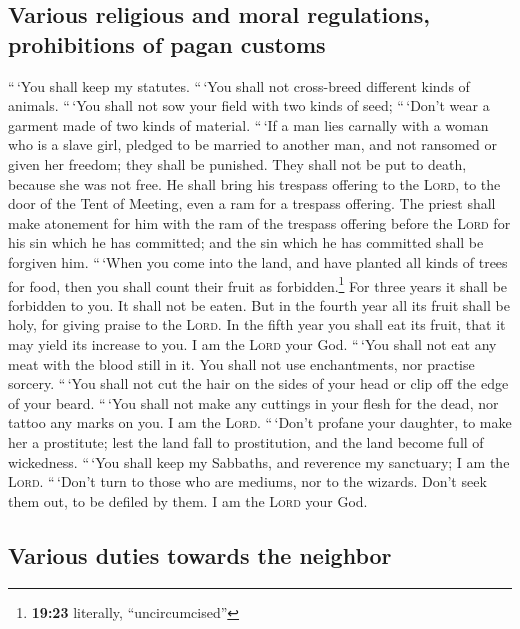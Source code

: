 \hypertarget{various-religious-and-moral-regulations-prohibitions-of-pagan-customs}{%
\subsection{Various religious and moral regulations, prohibitions of
pagan
customs}\label{various-religious-and-moral-regulations-prohibitions-of-pagan-customs}}

 ``\,`You shall keep my statutes. ``\,`You shall not
cross-breed different kinds of animals. ``\,`You shall not sow your
field with two kinds of seed; ``\,`Don't wear a garment made of two
kinds of material.  ``\,`If a man lies carnally with a
woman who is a slave girl, pledged to be married to another man, and not
ransomed or given her freedom; they shall be punished. They shall not be
put to death, because she was not free.  He shall bring
his trespass offering to the \textsc{Lord}, to the door of the Tent of
Meeting, even a ram for a trespass offering.  The priest
shall make atonement for him with the ram of the trespass offering
before the \textsc{Lord} for his sin which he has committed; and the sin
which he has committed shall be forgiven him.  ``\,`When
you come into the land, and have planted all kinds of trees for food,
then you shall count their fruit as forbidden.\footnote{\textbf{19:23}
  literally, ``uncircumcised''} For three years it shall be forbidden to
you. It shall not be eaten.  But in the fourth year all
its fruit shall be holy, for giving praise to the \textsc{Lord}.
 In the fifth year you shall eat its fruit, that it may
yield its increase to you. I am the \textsc{Lord} your God.
 ``\,`You shall not eat any meat with the blood still in
it. You shall not use enchantments, nor practise sorcery.
 ``\,`You shall not cut the hair on the sides of your
head or clip off the edge of your beard.  ``\,`You shall
not make any cuttings in your flesh for the dead, nor tattoo any marks
on you. I am the \textsc{Lord}.  ``\,`Don't profane your
daughter, to make her a prostitute; lest the land fall to prostitution,
and the land become full of wickedness.  ``\,`You shall
keep my Sabbaths, and reverence my sanctuary; I am the \textsc{Lord}.
 ``\,`Don't turn to those who are mediums, nor to the
wizards. Don't seek them out, to be defiled by them. I am the
\textsc{Lord} your God.

\hypertarget{various-duties-towards-the-neighbor}{%
\subsection{Various duties towards the
neighbor}\label{various-duties-towards-the-neighbor}}

